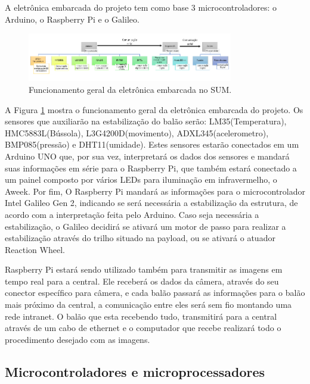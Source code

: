 A eletrônica embarcada do projeto tem como base 3 microcontroladores: o Arduino, o Raspberry Pi e o Galileo.

\begin{figure}[H]
	\centering
	\includegraphics[width=0.8\textwidth]{figuras/eletronicaembarcadasum}
	\caption{Funcionamento geral da eletrônica embarcada no SUM.}
	\label{img:eletronicaembarcadasum}
\end{figure}

A Figura \ref{img:eletronicaembarcadasum} mostra o funcionamento geral da eletrônica embarcada do projeto. Os sensores que auxiliarão na estabilização do balão serão: LM35(Temperatura), HMC5883L(Bússola), L3G4200D(movimento), ADXL345(acelerometro), BMP085(pressão) e DHT11(umidade). Estes sensores estarão conectados em um Arduino UNO que, por sua vez, interpretará os dados dos sensores e mandará suas informações em série para o Raspberry Pi, que também estará conectado a um painel composto por vários LEDs para iluminação em infravermelho, o Aweek. Por fim, O Raspberry Pi mandará as informações para o microcontrolador Intel Galileo Gen 2, indicando se será necessária a estabilização da estrutura, de acordo com a interpretação feita pelo Arduino. Caso seja necessária a estabilização, o Galileo decidirá se ativará um motor de passo para realizar a estabilização através do trilho situado na payload, ou se ativará o atuador Reaction Wheel.

Raspberry Pi estará sendo utilizado também para transmitir as imagens em tempo real para a central. Ele receberá os dados da câmera, através do seu conector específico para câmera, e cada balão passará as informações para o balão mais próximo da central, a comunicação entre eles será sem fio montando uma rede intranet. O balão que esta recebendo tudo, transmitirá para a central através de um cabo de ethernet e o computador que recebe realizará todo o procedimento desejado com as imagens.

\subsection{Microcontroladores e microprocessadores}

